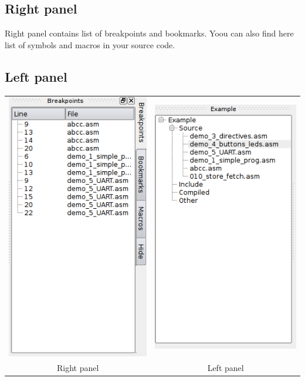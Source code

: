 \subsection{Right panel}
    Right panel contains list of breakpoints and bookmarks. Yoou can also find here list of symbols and macros in your source code.
    
\subsection{Left panel}

    \begin{table}[h!]
        \begin{tabular}{cc}
            \includegraphics[width=.33\textwidth]{img/right_panel.png}
                &
            \includegraphics[width=.33\textwidth]{img/left_panel.png}
                \\ 
            Right panel & Left panel
        \end{tabular}
    \end{table}

